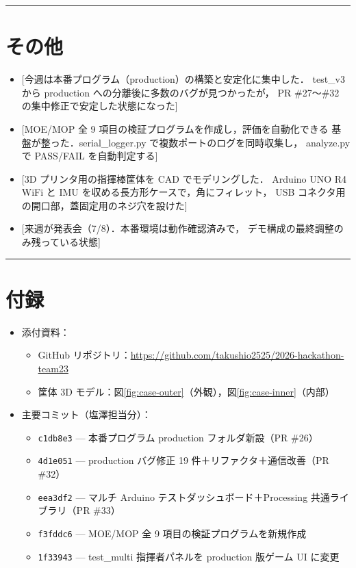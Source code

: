 \documentclass[uplatex,dvipdfmx,a4paper,11pt]{jsarticle}
\newcommand{\sectionrule}{\par\medskip\noindent\rule{\linewidth}{0.6pt}\par\medskip}
\begin{document}
\sectionrule

\section{その他}

\begin{itemize}
  \item {}[今週は本番プログラム（production）の構築と安定化に集中した．
        test\_v3 から production への分離後に多数のバグが見つかったが，
        PR \#27〜\#32 の集中修正で安定した状態になった]
  \item {}[MOE/MOP 全 9 項目の検証プログラムを作成し，評価を自動化できる
        基盤が整った．serial\_logger.py で複数ポートのログを同時収集し，
        analyze.py で PASS/FAIL を自動判定する]
  \item {}[3D プリンタ用の指揮棒筐体を CAD でモデリングした．
        Arduino UNO R4 WiFi と IMU を収める長方形ケースで，角にフィレット，
        USB コネクタ用の開口部，蓋固定用のネジ穴を設けた]
  \item {}[来週が発表会（7/8）．本番環境は動作確認済みで，
        デモ構成の最終調整のみ残っている状態]
\end{itemize}

\sectionrule

\section{付録}

\begin{itemize}
  \item 添付資料：
    \begin{itemize}
      \item GitHub リポジトリ：\url{https://github.com/takushio2525/2026-hackathon-team23}
      \item 筐体 3D モデル：図\ref{fig:case-outer}（外観），図\ref{fig:case-inner}（内部）
    \end{itemize}
  \item 主要コミット（塩澤担当分）：
    \begin{itemize}
      \item \texttt{c1db8e3} --- 本番プログラム production フォルダ新設（PR \#26）
      \item \texttt{4d1e051} --- production バグ修正 19 件＋リファクタ＋通信改善（PR \#32）
      \item \texttt{eea3df2} --- マルチ Arduino テストダッシュボード＋Processing 共通ライブラリ（PR \#33）
      \item \texttt{f3fddc6} --- MOE/MOP 全 9 項目の検証プログラムを新規作成
      \item \texttt{1f33943} --- test\_multi 指揮者パネルを production 版ゲーム UI に変更
    \end{itemize}
\end{itemize}
\end{document}
